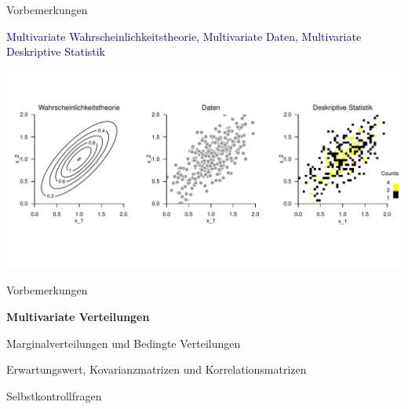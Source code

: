 \documentclass[
  8pt,
  ignorenonframetext,
]{beamer}
\begin{document}
\begin{frame}{Vorbemerkungen}
\protect\hypertarget{vorbemerkungen-5}{}
\small

\textcolor{darkblue}{Multivariate Wahrscheinlichkeitstheorie, Multivariate Daten, Multivariate Deskriptive Statistik}

\begin{center}\includegraphics[width=1\linewidth]{5_Abbildungen/mvda_5_multivariate_statistik} \end{center}
\end{frame}

\begin{frame}{}
\protect\hypertarget{section-4}{}
\large
{}
\vfill

Vorbemerkungen

\textbf{Multivariate Verteilungen}

Marginalverteilungen und Bedingte Verteilungen

Erwartungswert, Kovarianzmatrizen und Korrelationsmatrizen

Selbstkontrollfragen \vfill
\end{frame}
\end{document}
